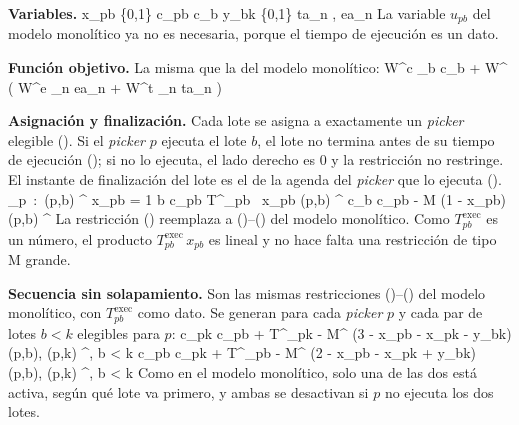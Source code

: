 {\bf Variables.}
\startformula
	\startalign[n=2, align={right,left}]
		\NC x_{pb} \in \{0,1\} \NC \quad {} \NR
		\NC c_{pb}  \NC \quad {} \NR
		\NC c_b  \NC \quad {} \NR
		\NC y_{bk} \in \{0,1\} \NC \quad {} \NR
		\NC ta_n ,\; ea_n  \NC \quad {} \NR
	\stopalign
\stopformula
La variable $u_{pb}$ del modelo monolítico ya no es necesaria, porque el
tiempo de ejecución es un dato.

{\bf Función objetivo.} La misma que la del modelo monolítico:
\startplaceformula[reference=eq:split_objetivo2]
\startformula
	\min \quad W^{c} \sum_{b \in {}} c_b \;+\; W^{} \left( W^{e} \sum_{n \in {}} ea_n + W^{t} \sum_{n \in {}} ta_n \right)
\stopformula
\stopplaceformula

{\bf Asignación y finalización.}
Cada lote se asigna a exactamente un {\em picker} elegible
(). Si el {\em picker} $p$ ejecuta el lote $b$, el
lote no termina antes de su tiempo de ejecución (); si no
lo ejecuta, el lado derecho es 0 y la restricción no restringe. El instante
de finalización del lote es el de la agenda del {\em picker} que lo ejecuta
(\in[eq:split_cb]).
\startplaceformula
\startformula
	\startalign[n=3, align={right,left,left}]
		\NC \NC \sum_{p \,:\, (p,b) \in {}^{}} x_{pb} = 1 \NC \qquad \forall b \in {} 
		\NC \NC c_{pb} \geq T^{}_{pb} \, x_{pb} \NC \qquad \forall (p,b) \in {}^{} 
		\NC \NC c_b \geq c_{pb} - M (1 - x_{pb}) \NC \qquad \forall (p,b) \in {}^{} \NR[eq:split_cb]
	\stopalign
\stopformula
\stopplaceformula
La restricción () reemplaza a
()--() del modelo monolítico. Como
$T^{\text{exec}}_{pb}$ es un número, el producto
$T^{\text{exec}}_{pb} \, x_{pb}$ es lineal y no hace falta una restricción
de tipo M grande.

{\bf Secuencia sin solapamiento.}
Son las mismas restricciones ()--() del
modelo monolítico, con $T^{\text{exec}}_{pb}$ como dato. Se generan para
cada {\em picker} $p$ y cada par de lotes $b < k$ elegibles para $p$:
\startplaceformula
\startformula
	\startalign[n=3, align={right,left,left}]
		\NC \NC c_{pk} \geq c_{pb} + T^{}_{pk} - M^{} (3 - x_{pb} - x_{pk} - y_{bk}) \NC \quad \forall (p,b), (p,k) \in {}^{},\; b < k 
		\NC \NC c_{pb} \geq c_{pk} + T^{}_{pb} - M^{} (2 - x_{pb} - x_{pk} + y_{bk}) \NC \quad \forall (p,b), (p,k) \in {}^{},\; b < k 
	\stopalign
\stopformula
\stopplaceformula
Como en el modelo monolítico, solo una de las dos está activa, según qué
lote va primero, y ambas se desactivan si $p$ no ejecuta los dos lotes.

